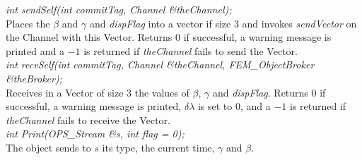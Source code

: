{\em int sendSelf(int commitTag, Channel \&theChannel); } \\ 
Places the $\beta$ and $\gamma$ and {\em dispFlag} into a vector if size 3
and invokes {\em sendVector} on the Channel with this Vector. Returns
$0$ if successful, a warning message is printed and a $-1$ is
returned if {\em theChannel} fails to send the Vector. \\ 

{\em int recvSelf(int commitTag, Channel \&theChannel, 
FEM\_ObjectBroker \&theBroker); } \\ 
Receives in a Vector of size 3 the values of $\beta$, $\gamma$ and
{\em dispFlag}. Returns $0$ if successful, a warning message is printed,
$\delta \lambda$ is set to $0$, and a $-1$ is returned if {\em
theChannel} fails to receive the Vector.\\

{\em int Print(OPS_Stream \&s, int flag = 0);}\\
The object sends to $s$ its type, the current time, $\gamma$ and
$\beta$. 






